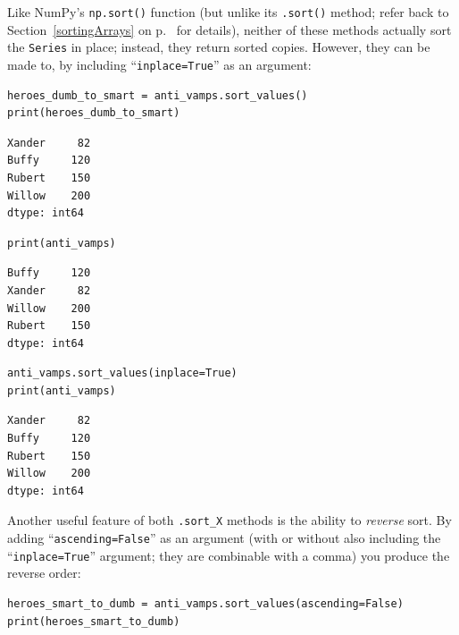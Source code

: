 Like NumPy's \texttt{np.sort()} function (but unlike its \texttt{.sort()}
method; refer back to Section~\ref{sortingArrays} on p.~\pageref{sortingArrays}
for details), neither of these methods actually sort the \texttt{Series} in
place; instead, they return sorted copies. However, they can be made to, by
including ``\texttt{inplace=True}'' as an argument:

\begin{Verbatim}[fontsize=\small,samepage=true,frame=single,framesep=3mm]
heroes_dumb_to_smart = anti_vamps.sort_values()
print(heroes_dumb_to_smart)
\end{Verbatim}
\vspace{-.3in}

\begin{Verbatim}[fontsize=\small,samepage=true,frame=leftline,framesep=5mm,framerule=1mm]
Xander     82
Buffy     120
Rubert    150
Willow    200
dtype: int64
\end{Verbatim}

\begin{Verbatim}[fontsize=\small,samepage=true,frame=single,framesep=3mm]
print(anti_vamps)
\end{Verbatim}
\vspace{-.3in}

\begin{Verbatim}[fontsize=\small,samepage=true,frame=leftline,framesep=5mm,framerule=1mm]
Buffy     120
Xander     82
Willow    200
Rubert    150
dtype: int64
\end{Verbatim}

\begin{Verbatim}[fontsize=\small,samepage=true,frame=single,framesep=3mm]
anti_vamps.sort_values(inplace=True)
print(anti_vamps)
\end{Verbatim}
\vspace{-.3in}

\begin{Verbatim}[fontsize=\small,samepage=true,frame=leftline,framesep=5mm,framerule=1mm]
Xander     82
Buffy     120
Rubert    150
Willow    200
dtype: int64
\end{Verbatim}

Another useful feature of both \texttt{.sort\_X} methods is the ability to
\textit{reverse} sort. By adding ``\texttt{ascending=False}'' as an argument
(with or without also including the ``\texttt{inplace=True}'' argument; they
are combinable with a comma) you produce the reverse order:

\begin{Verbatim}[fontsize=\small,samepage=true,frame=single,framesep=3mm]
heroes_smart_to_dumb = anti_vamps.sort_values(ascending=False)
print(heroes_smart_to_dumb)
\end{Verbatim}
\vspace{-.3in}

